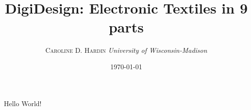 \documentclass[12pt]{article}
\title{\textbf{DigiDesign: } %
Electronic Textiles in 9 parts} %
\author{\textsc{Caroline D. Hardin} %
{\textit{University of Wisconsin-Madison}}} %
\date{\today} %
\begin{document}


Hello World!
\end{document}
